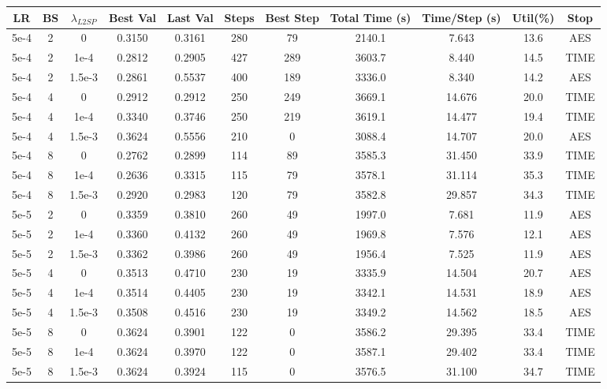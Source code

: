 \begin{table}[p]
\centering
\scriptsize
\renewcommand{\arraystretch}{0.9}
\begin{adjustbox}{max width=\textwidth,max totalheight=\textheight}
\begin{tabular}{ccccccccccc}
\hline
LR & BS & $\lambda_{L2SP}$ & Best Val & Last Val & Steps & Best Step & Total Time (s) & Time/Step (s) & Util(\%) & Stop\\
\hline
5e-4&2&0&0.3150&0.3161&280&79&2140.1&7.643&13.6&AES\\
5e-4&2&1e-4&0.2812&0.2905&427&289&3603.7&8.440&14.5&TIME\\
5e-4&2&1.5e-3&0.2861&0.5537&400&189&3336.0&8.340&14.2&AES\\
5e-4&4&0&0.2912&0.2912&250&249&3669.1&14.676&20.0&TIME\\
5e-4&4&1e-4&0.3340&0.3746&250&219&3619.1&14.477&19.4&TIME\\
5e-4&4&1.5e-3&0.3624&0.5556&210&0&3088.4&14.707&20.0&AES\\
5e-4&8&0&0.2762&0.2899&114&89&3585.3&31.450&33.9&TIME\\
5e-4&8&1e-4&0.2636&0.3315&115&79&3578.1&31.114&35.3&TIME\\
5e-4&8&1.5e-3&0.2920&0.2983&120&79&3582.8&29.857&34.3&TIME\\

5e-5&2&0&0.3359&0.3810&260&49&1997.0&7.681&11.9&AES\\
5e-5&2&1e-4&0.3360&0.4132&260&49&1969.8&7.576&12.1&AES\\
5e-5&2&1.5e-3&0.3362&0.3986&260&49&1956.4&7.525&11.9&AES\\
5e-5&4&0&0.3513&0.4710&230&19&3335.9&14.504&20.7&AES\\
5e-5&4&1e-4&0.3514&0.4405&230&19&3342.1&14.531&18.9&AES\\
5e-5&4&1.5e-3&0.3508&0.4516&230&19&3349.2&14.562&18.5&AES\\
5e-5&8&0&0.3624&0.3901&122&0&3586.2&29.395&33.4&TIME\\
5e-5&8&1e-4&0.3624&0.3970&122&0&3587.1&29.402&33.4&TIME\\
5e-5&8&1.5e-3&0.3624&0.3924&115&0&3576.5&31.100&34.7&TIME\\


\end{tabular}
\end{adjustbox}
\end{table}
